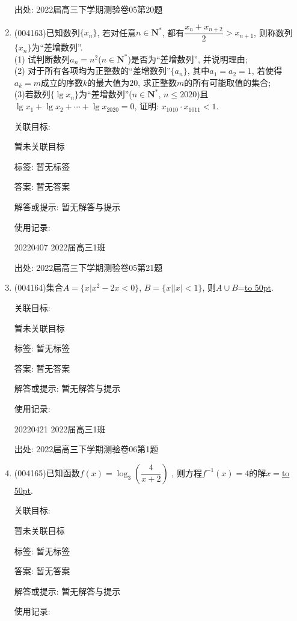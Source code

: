 \documentclass[10pt,a4paper]{article}
\newcommand{\blank}[1]{\underline{\hbox to #1pt{}}}
\begin{document}
\begin{enumerate}[1.]
出处: 2022届高三下学期测验卷05第20题
\item { (004163)}已知数列$\{x_n\}$, 若对任意$n\in \mathbf{N}^*$, 都有$\dfrac{x_n+x_{n+2}}2>x_{n+1}$, 则称数列$\{x_n\}$为``差增数列''.\\
(1) 试判断数列$a_n=n^2$($n\in \mathbf{N}^*$)是否为``差增数列'', 并说明理由;\\
(2) 对于所有各项均为正整数的``差增数列''$\{a_n\}$, 其中$a_1=a_2=1$, 若使得$a_k=m$成立的序数$k$的最大值为$20$, 求正整数$m$的所有可能取值的集合;\\
(3)若数列$\{\lg x_n\}$为``差增数列''($n\in \mathbf{N}^*$, $n\le 2020$)且$\lg x_1+\lg x_2+\cdots +\lg x_{2020}=0$, 证明: $x_{1010}\cdot x_{1011}<1$.


关联目标:

暂未关联目标



标签: 暂无标签

答案: 暂无答案

解答或提示: 暂无解答与提示

使用记录:

20220407	2022届高三1班			


出处: 2022届高三下学期测验卷05第21题
\item { (004164)}集合$A=\{x|x^2-2x<0\}$, $B=\{x||x|<1\}$, 则$A\cup B$=\blank{50}.


关联目标:

暂未关联目标



标签: 暂无标签

答案: 暂无答案

解答或提示: 暂无解答与提示

使用记录:

20220421	2022届高三1班	


出处: 2022届高三下学期测验卷06第1题
\item { (004165)}已知函数$f(x)=\log_3(\dfrac 4{x+2})$ , 则方程$f^{-1}(x)=4$的解$x=$\blank{50}.


关联目标:

暂未关联目标



标签: 暂无标签

答案: 暂无答案

解答或提示: 暂无解答与提示

使用记录:


\end{enumerate}
\end{document}
